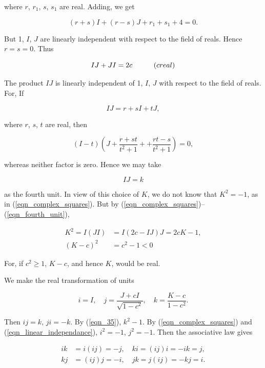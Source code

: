 \documentclass{article}
\begin{document}
where $r$, $r_{1}$, $s$, $s_{1}$ are real. Adding, we get

$$
(r+s)I+(r-s)J+r_{1}+s_{1}+4=0.
$$

But 1, $I$, $J$ are linearly independent with respect to the field of reals. Hence $r=s=0$. Thus

\begin{equation}
  \label{eqn_linear_independance}
  IJ+JI = 2c\quad\quad\quad \textnormal(c real)
\end{equation}

The product $IJ$ is linearly independent of 1, $I$, $J$ with respect to the field of reals. For, If

$$
IJ=r+sI+tJ,
$$

where $r$, $s$, $t$ are real, then

$$
(I-t)\left(J+\frac{r+st}{t^{2}+1}++\frac{rt-s}{t^{2}+1}\right) = 0,
$$

whereas neither factor is zero. Hence we may take

\begin{equation}
  \label{eqn_fourth_unit}
  IJ=k
\end{equation}

as the fourth unit. In view of this choice of $K$, we do not know that $K^{2}=-1$, as in (\ref{eqn_complex_squares}). But by (\ref{eqn_complex_squares})--(\ref{eqn_fourth_unit}),

\begin{equation}
  \label{eqn_35}
  \begin{split}
    K^{2}=I(JI)&=I(2c-IJ)J=2cK-1,\\
    (K-c)^{2}&=c^{2}-1<0
  \end{split}
\end{equation}

For, if $c^{2} \geq 1$, $K-c$, and hence $K$, would be real.

We make the real transformation of units

$$
i=I,\quad j=\frac{J+cI}{\sqrt{1-c^{2}}},\quad k=\frac{K-c}{1-c^{2}}.
$$

Then $ij=k,\,ji=-k$. By (\ref{eqn_35}), $k^{2}-1$. By (\ref{eqn_complex_squares}) and (\ref{eqn_linear_independance}), $i^{2}=-1$, $j^{2}=-1$. Then the associative law gives

\begin{equation*}
  \begin{split}
    ik&=i(ij)=-j,\quad ki=(ij)i=-ik=j, \\
    kj&=(ij)j=-i,\quad jk=j(ij)=-kj=i.
  \end{split}
\end{equation*}
\end{document}

